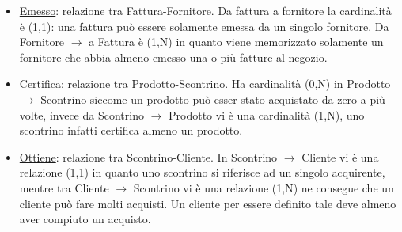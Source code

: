 \begin{itemize}
\item \underline{Emesso}: relazione tra Fattura-Fornitore. Da fattura a fornitore la cardinalit\`a \`e (1,1): una fattura pu\`o essere solamente emessa da un singolo fornitore. \newline
  Da Fornitore $\to$ a Fattura \`e (1,N) in quanto viene memorizzato solamente un fornitore che abbia almeno emesso una o pi\`u fatture al negozio.

\item \underline{Certifica}: relazione tra Prodotto-Scontrino. Ha cardinalit\`a (0,N) in Prodotto $\to$ Scontrino siccome un prodotto pu\`o esser stato acquistato da zero a pi\`u volte, invece da Scontrino $\to$ Prodotto vi \`e una cardinalit\`a (1,N), uno scontrino infatti certifica almeno un prodotto.

\item \underline{Ottiene}: relazione tra Scontrino-Cliente. In Scontrino $\to$ Cliente vi \`e una relazione (1,1) in quanto uno scontrino si riferisce ad un singolo acquirente, mentre tra Cliente $\to$ Scontrino vi \`e una relazione (1,N) ne consegue che un cliente pu\`o fare molti acquisti. Un cliente per essere definito tale deve almeno aver compiuto un acquisto.
  
\end{itemize}

